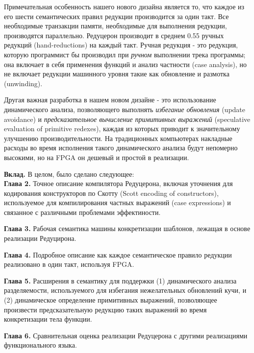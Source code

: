 \documentclass[14pt]{extarticle}
\begin{document}
Примечательная особенность нашего нового дизайна является то, что каждое из его шести семантических правил редукции производится за один такт. Все необходимые транзакции памяти, необходимые для выполнения редукции, производятся параллельно. Редуцерон производит в среднем 0.55 ручных редукций (hand-reductions) на каждый такт. Ручная редукция - это редукция, которую программист бы производил при \textit{ручном} выполнении трека программы; она включает в себя применения функций и анализ частности (case analysis), но не включает редукции машинного уровня такие как обновление и размотка (unwinding). 

Другая важная разработка в нашем новом дизайне - это использование динамического анализа, позволяющего выполнять \textit{избегание обновления} (update avoidance) и \textit{предсказательное вычисление примитивных выражений} (speculative evaluation of primitive redexes), каждая из которых приводит к значительному улучшению производительности. На традиционных компьютерах накладные расходы во время исполнения такого динамического анализа будут непомерно высокими, но на FPGA он дешевый и простой в реализации.

\textbf{Вклад.} В целом, было сделано следующее: \\
\textbf{Глава 2.} Точное описание компилятора Редуцерона, включая уточнения для кодирования конструкторов по Скотту (Scott encoding of constructors), используемое для компилирования частных выражений (case expressions) и связанное с различными проблемами эффектиности.

\textbf{Глава 3.} Рабочая семантика машины конкретизации шаблонов, лежащая в основе реализации Редуцирона.

\textbf{Глава 4.} Подробное описание как каждое семантическое правило редукции реализовано в один такт, используя FPGA.

\textbf{Глава 5.} Расширения в семантику для поддержки (1) динамического анализа разделяемости, используемого для избегания нежелательных обновлений кучи, и (2) динамическое определение примитивных выражений, позволяющее произвести предсказательную редукцию таких выражений во время конкретизации тела функции. 

\textbf{Глава 6.} Сравнительная оценка реализации Редуцерона с другими реализациями функционального языка.
\end{document}
